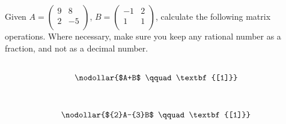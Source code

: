 \documentclass[a4paper, leqno, 12pt]{article}
\newenvironment{top_enumerate}{
\begin{enumerate}
  \setlength{\itemsep}{2em}
  \setlength{\topsep}{-0pt}
  \setlength{\partopsep}{-0pt}
}{\end{enumerate}}
\newlength{\EqL}
\newlength{\RunL}
\newcommand{\EqContent}{foo}
\begin{document}
\begin{top_enumerate}
\begin{enumerate}
	\begin{center}
	\end{center}
	 \quad \textbf{}
\end{enumerate}\newpage
\item Given \(A=\left( {\begin{array}{cc}
   {9} & {8} \\
   {2} & {-5} \\
 \end{array} } \right) \), \(B=\left( {\begin{array}{cc}
     {-1} & {2} \\
     {1} & {1} \\
    \end{array} } \right) \), calculate the following matrix operations. Where necessary, make sure you keep any rational number as a fraction, and not as a decimal number.
 \\ 
\setcounter{equation}{0}  %
\setlength{\RunL}{0pt}
	\renewcommand{\EqContent}{\nodollar{$A+B$
	\qquad\textbf{[1]}}}
	\settowidth{\EqL}{$\qquad\EqContent\qquad$}
	\setlength{\RunL}{\RunL+\EqL}
		{\setlength{\RunL}{0pt}
		\\}
		{}
	\begin{minipage}{\EqL}
	\begin{equation}
	\EqContent
	\end{equation}
	\end{minipage}
	\renewcommand{\EqContent}{\nodollar{${2}A-{3}B$
	\qquad\textbf{[1]}}}
	\settowidth{\EqL}{$\qquad\EqContent\qquad$}
	\setlength{\RunL}{\RunL+\EqL}
		{\setlength{\RunL}{0pt}
		\\}
		{}
	\begin{minipage}{\EqL}
	\begin{equation}
	\EqContent
	\end{equation}
	\end{minipage}
	\renewcommand{\EqContent}{\nodollar{${5}A+{2}B$
}}
\end{top_enumerate}
\end{document}
